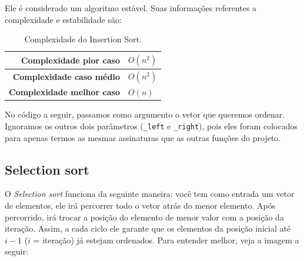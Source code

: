 Ele é considerado um algoritmo estável. Suas informações referentes a complexidade e estabilidade são:

\begin{table}[H]
 \centering
	\begin{tabular}{| r | l |}
		\hline
		\textbf{Complexidade pior caso}   & $O(n^{2})$ \\
		\hline
		\textbf{Complexidade caso médio}  & $O(n^{2})$ \\
		\hline
		\textbf{Complexidade melhor caso} & $O(n)$ \\
		\hline
	\end{tabular}
	\caption{Complexidade do Insertion Sort.}
	\label{t_insertion_sort}
\end{table}

No código a seguir, passamos como argumento o vetor que queremos ordenar. Ignoramos os outros dois parâmetros (\texttt{\_left} e \texttt{\_right}), pois eles foram colocados para apenas termos as mesmas assinaturas que as outras funções do projeto.



\subsection{Selection sort}
O \textit{Selection sort} funciona da seguinte maneira: você tem como entrada um vetor de elementos, ele irá percorrer todo o vetor atrás do menor elemento. Após percorrido, irá trocar a posição do elemento de menor valor com a posição da iteração. Assim, a cada ciclo ele garante que os elementos da posição inicial até $i-1$ ($i$ = iteração) já estejam ordenados. Para entender melhor, veja a imagem a seguir:

